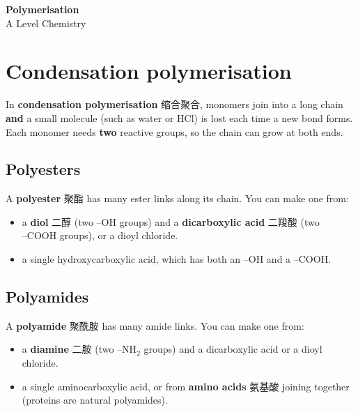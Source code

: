 \documentclass[11pt]{article}
\begin{document}
\begin{center}
  {\LARGE\bfseries Polymerisation}\\[0.35em]
  {\large A Level Chemistry}
\end{center}
\vspace{0.6em}

\section*{Condensation polymerisation}

In \textbf{condensation polymerisation} 缩合聚合, monomers join into a long chain \textbf{and} a small molecule (such as water or $\text{HCl}$) is lost each time a new bond forms. Each monomer needs \textbf{two} reactive groups, so the chain can grow at both ends.

\subsection*{Polyesters}

A \textbf{polyester} 聚酯 has many ester links along its chain. You can make one from:

\begin{itemize}
\item a \textbf{diol} 二醇 (two $\text{–OH}$ groups) and a \textbf{dicarboxylic acid} 二羧酸 (two $\text{–COOH}$ groups), or a dioyl chloride.

\item a single hydroxycarboxylic acid, which has both an $\text{–OH}$ and a $\text{–COOH}$.

\end{itemize}

\subsection*{Polyamides}

A \textbf{polyamide} 聚酰胺 has many amide links. You can make one from:

\begin{itemize}
\item a \textbf{diamine} 二胺 (two $\text{–NH}_2$ groups) and a dicarboxylic acid or a dioyl chloride.

\item a single aminocarboxylic acid, or from \textbf{amino acids} 氨基酸 joining together (proteins are natural polyamides).

\end{itemize}
\end{document}
